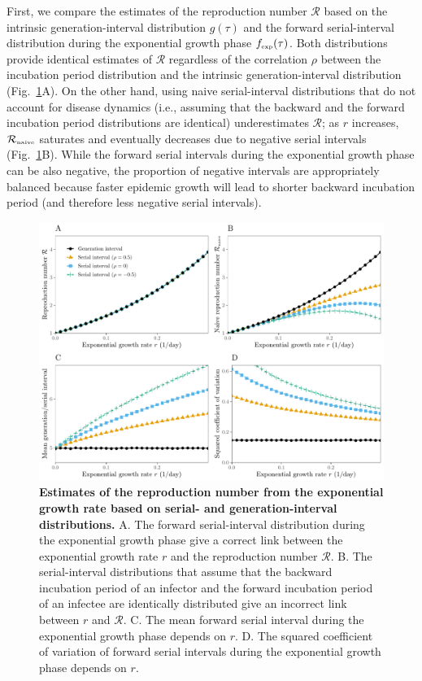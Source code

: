 \documentclass[12pt]{article}
\newcommand{\fref}[1]{Fig.~\ref{fig:#1}}
\begin{document}
First, we compare the estimates of the reproduction number $\mathcal R$ based on the intrinsic generation-interval distribution $g(\tau)$ and the forward serial-interval distribution during the exponential growth phase $f_{\textrm{\tiny exp}}(\tau)$.
Both distributions provide identical estimates of $\mathcal R$ regardless of the correlation $\rho$ between the incubation period distribution and the intrinsic generation-interval distribution (\fref{rR}A).
On the other hand, using naive serial-interval distributions that do not account for disease dynamics (i.e., assuming that the backward and the forward incubation period distributions are identical) underestimates $\mathcal R$;
as $r$ increases, ${\mathcal R}_{\textrm{\tiny naive}}$ saturates and eventually decreases due to negative serial intervals (\fref{rR}B).
While the forward serial intervals during the exponential growth phase can be also negative, the proportion of negative intervals are appropriately balanced because faster epidemic growth will lead to shorter backward incubation period (and therefore less negative serial intervals).

\begin{figure}[!th]
\includegraphics[width=\textwidth]{rR.pdf}
\caption{
\textbf{Estimates of the reproduction number from the exponential growth rate based on serial- and generation-interval distributions.}
A. The forward serial-interval distribution during the exponential growth phase give a correct link between the exponential growth rate $r$ and the reproduction number $\mathcal R$.
B. The serial-interval distributions that assume that the backward incubation period of an infector and the forward incubation period of an infectee are identically distributed give an incorrect link between $r$ and $\mathcal R$.
C. The mean forward serial interval during the exponential growth phase depends on $r$.
D. The squared coefficient of variation of forward serial intervals during the exponential growth phase depends on $r$.
}
\label{fig:rR}
\end{figure}
\end{document}
